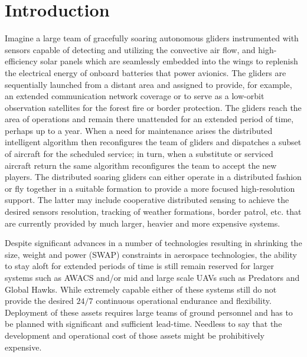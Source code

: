 \documentclass{ifacconf}
\begin{document}
\section{Introduction}
Imagine a large team of gracefully soaring autonomous gliders instrumented with sensors capable of detecting and utilizing the convective air flow, and high-efficiency solar panels which are seamlessly embedded into the wings to replenish the electrical energy of onboard batteries that power avionics. The gliders are sequentially launched from a distant area and assigned to provide, for example, an extended communication network coverage or to serve as a low-orbit observation satellites for the forest fire or border protection. The gliders reach the area of operations and remain there unattended for an extended period of time, perhaps up to a year. When a need for maintenance arises the distributed intelligent algorithm then reconfigures the team of gliders and dispatches a subset of aircraft for the scheduled service; in turn, when a substitute or serviced aircraft return the same algorithm reconfigures the team to accept the new players. The distributed soaring gliders can either operate in a distributed fashion or fly together in a suitable formation to provide a more focused high-resolution support. The latter may include cooperative distributed sensing to achieve the desired sensors resolution, tracking of weather formations, border patrol, etc. that are currently provided by much larger, heavier and more expensive systems.

Despite significant advances in a number of technologies resulting in shrinking the size, weight and power (SWAP) constraints in aerospace technologies, the ability to stay aloft for extended periods of time is still remain reserved for larger systems such as AWACS and/or mid and large scale UAVs such as Predators and Global Hawks. While extremely capable either of these systems still do not provide the desired $24/7$ continuous operational endurance and flexibility. Deployment of these assets requires large teams of ground personnel and has to be planned with significant and sufficient lead-time. Needless to say that the development and operational cost of those assets might be prohibitively expensive.
\end{document}
